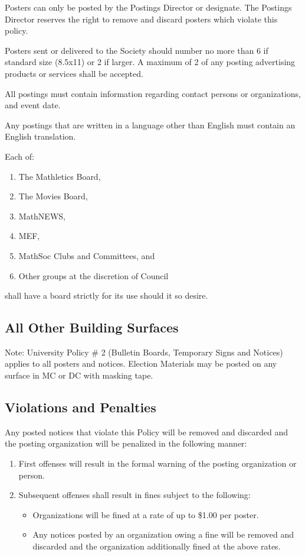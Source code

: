 Posters can only be posted by the Postings Director or designate. The Postings Director reserves the right to remove and discard posters which violate this policy.

Posters sent or delivered to the Society should number no more than 6 if standard size (8.5x11) or 2 if larger. A maximum of 2 of any posting advertising products or services shall be accepted.

All postings must contain information regarding contact persons or organizations, and event date.

Any postings that are written in a language other than English must contain an English translation.

Each of:
\begin{enumerate}
\item The Mathletics Board,
\item The Movies Board,
\item MathNEWS,
\item MEF,
\item MathSoc Clubs and Committees, and
\item Other groups at the discretion of Council
\end{enumerate}
shall have a board strictly for its use should it so desire.

\subsection{All Other Building Surfaces}
Note: University Policy \# 2 (Bulletin Boards, Temporary Signs and Notices) applies to all posters and notices. Election Materials may be posted on any surface in MC or DC with masking tape.

\subsection{Violations and Penalties}
Any posted notices that violate this Policy will be removed and discarded and the posting organization will be penalized in the following manner:
\begin{enumerate}
\item First offenses will result in the formal warning of the posting organization or person.
\item Subsequent offenses shall result in fines subject to the following:
	\begin{itemize}
	\item Organizations will be fined at a rate of up to \$1.00 per poster.
	\item Any notices posted by an organization owing a fine will be removed and discarded and the organization additionally fined at the above rates.
	\end{itemize}
\end{enumerate}
	


